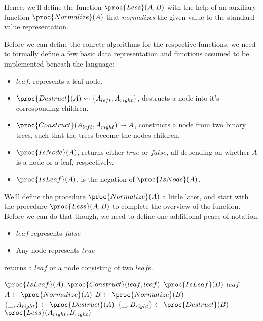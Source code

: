 Hence, we'll define the function $\proc{Less}(A,B)$ with the help of an
auxiliary function $\proc{Normalize}(A)$ that \emph{normalizes} the given value
to the standard value representation.

Before we can define the conrete algorithms for the respective functions, we
need to formally define a few basic data representation and functions assumed
to be implemented beneath the language:

\begin{itemize}

\item $leaf$, represents a leaf node.

\item $\proc{Destruct}(A)\leadsto \{A_{left}, A_{right}\}$, destructs a node
into it's corresponding children.

\item $\proc{Construct}(A_{left},A_{right})\leadsto A$, constructs a node from
two binary trees, such that the trees become the nodes children.

\item $\proc{IsNode}(A)$, returns either $true$ or $false$, all depending on
whether $A$ is a node or a leaf, respectively.

\item $\proc{IsLeaf}(A)$, is the negation of $\proc{IsNode}(A)$.

\end{itemize}

We'll define the procedure $\proc{Normalize}(A)$ a little later, and start with
the procedure $\proc{Less}(A,B)$ to complete the overview of the function.
Before we can do that though, we need to define one additional peace of
notation:

\begin{itemize}

\item $leaf$ represents $false$

\item Any node represents $true$

\end{itemize}


returns a $leaf$ or a node consisting of two $leaf$s.

\begin{codebox}
\li \If $\proc{IsLeaf}(A)$ \Then
\li   \Return $\proc{Construct}(leaf,leaf)$
    \End
\li \If $\proc{IsLeaf}(B)$ \Then
\li   \Return $leaf$
    \End
\zi
\li $A\gets \proc{Normalize}(A)$
\li $B\gets \proc{Normalize}(B)$
\zi
\li $\{\_, A_{right}\} \gets \proc{Destruct}(A)$
\li $\{\_, B_{right}\} \gets \proc{Destruct}(B)$
\zi
\li \Return $\proc{Less}(A_{right},B_{right})$
\end{codebox}

